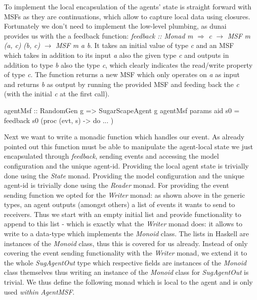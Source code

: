 To implement the local encapsulation of the agents' state is straight forward with MSFs as they are continuations, which allow to capture local data using closures. Fortunately we don't need to implement the low-level plumbing, as dunai provides us with the a feedback function: \textit{feedback :: Monad m $\Rightarrow$ c $\rightarrow$ MSF m (a, c) (b, c) $\rightarrow$ MSF m a b}. It takes an initial value of type \textit{c} and an MSF which takes in addition to its input \textit{a} also the given type \textit{c} and outputs in addition to type \textit{b} also the type \textit{c}, which clearly indicates the read/write property of type \textit{c}. The function returns a new MSF which only operates on \textit{a} as input and returns \textit{b} as output by running the provided MSF and feeding back the \textit{c} (with the initial \textit{c} at the first call).

\begin{HaskellCode}
agentMsf :: RandomGen g => SugarScapeAgent g
agentMsf params aid s0 = feedback s0 (proc (evt, s) -> do ... )
\end{HaskellCode}

Next we want to write a monadic function which handles our event. As already pointed out this function must be able to manipulate the agent-local state we just encapsulated through \textit{feedback}, sending events and accessing the model configuration and the unique agent-id. Providing the local agent state is trivially done using the \textit{State} monad. Providing the model configuration and the unique agent-id is trivially done using the \textit{Reader} monad. For providing the event sending function we opted for the \textit{Writer} monad: as shown above in the generic types, an agent outputs (amongst others) a list of events it wants to send to receivers. Thus we start with an empty initial list and provide functionality to append to this list - which is exactly what the \textit{Writer} monad does: it allows to write to a data-type which implements the \textit{Monoid} class. The lists in Haskell are instances of the \textit{Monoid} class, thus this is covered for us already. Instead of only covering the event sending functionality with the \textit{Writer} monad, we extend it to the whole \textit{SugAgentOut} type which respective fields are instances of the \textit{Monoid} class themselves thus writing an instance of the \textit{Monoid} class for \textit{SugAgentOut} is trivial. We thus define the following monad which is local to the agent and is only used \textit{within} \textit{AgentMSF}.

